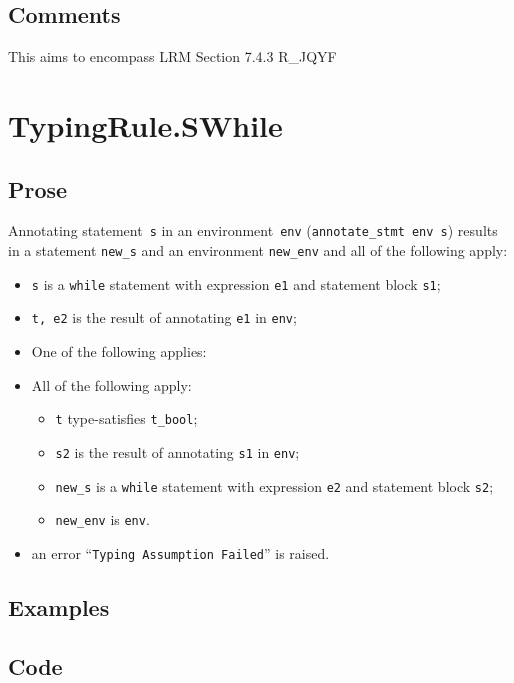 \documentclass{book}
\begin{document}
  \subsection{Comments}
    This aims to encompass LRM Section 7.4.3 R\_JQYF

    
\section{TypingRule.SWhile \label{sec:TypingRule.SWhile}}

  \subsection{Prose}
Annotating statement~\texttt{s} in an environment~\texttt{env}
(\texttt{annotate\_stmt env s}) results in a statement \texttt{new\_s} and an
environment \texttt{new\_env} and all of the following apply:
   \begin{itemize}
   \item \texttt{s} is a \texttt{while} statement with expression \texttt{e1} and statement block \texttt{s1};
   \item \texttt{t, e2} is the result of annotating \texttt{e1} in \texttt{env};
   \item One of the following applies:
     \item All of the following apply:
       \begin{itemize}
       \item \texttt{t} type-satisfies \texttt{t\_bool}; 
       \item \texttt{s2} is the result of annotating \texttt{s1} in \texttt{env};
       \item \texttt{new\_s} is a \texttt{while} statement with expression \texttt{e2} and statement block \texttt{s2};
       \item \texttt{new\_env} is \texttt{env}.
       \end{itemize}
     \item an error ``\texttt{Typing Assumption Failed}'' is raised.
   \end{itemize}

  \subsection{Examples}

  \subsection{Code}
\end{document}
